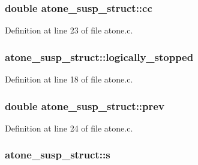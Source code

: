 \subsubsection[{\texorpdfstring{cc}{cc}}]{\setlength{\rightskip}{0pt plus 5cm}double atone\+\_\+susp\+\_\+struct\+::cc}\hypertarget{structatone__susp__struct_ad0dfae4adf154018aadf5c67bf73de36}{}\label{structatone__susp__struct_ad0dfae4adf154018aadf5c67bf73de36}


Definition at line 23 of file atone.\+c.

\subsubsection[{\texorpdfstring{logically\+\_\+stopped}{logically_stopped}}]{ atone\+\_\+susp\+\_\+struct\+::logically\+\_\+stopped}\hypertarget{structatone__susp__struct_aaccd0a3b8a4d11bb14a7559713714e14}{}\label{structatone__susp__struct_aaccd0a3b8a4d11bb14a7559713714e14}


Definition at line 18 of file atone.\+c.

\subsubsection[{\texorpdfstring{prev}{prev}}]{\setlength{\rightskip}{0pt plus 5cm}double atone\+\_\+susp\+\_\+struct\+::prev}\hypertarget{structatone__susp__struct_a45e01f25c0e80bb34406cf4ca156504a}{}\label{structatone__susp__struct_a45e01f25c0e80bb34406cf4ca156504a}


Definition at line 24 of file atone.\+c.

\subsubsection[{\texorpdfstring{s}{s}}]{ atone\+\_\+susp\+\_\+struct\+::s}\hypertarget{structatone__susp__struct_a4261aab27d908105c65d3672fdf5fd56}{}\label{structatone__susp__struct_a4261aab27d908105c65d3672fdf5fd56}


